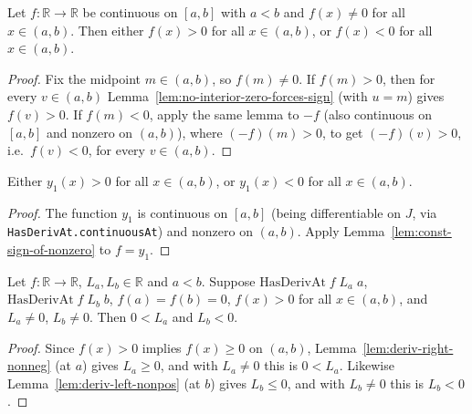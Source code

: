 \begin{lemma}
    \label{lem:const-sign-of-nonzero}
    \leanok
    Let $f : \mathbb{R} \to \mathbb{R}$ be continuous on $[a,b]$ with $a < b$ and
    $f(x) \ne 0$ for all $x \in (a,b)$. Then either $f(x) > 0$ for all
    $x \in (a,b)$, or $f(x) < 0$ for all $x \in (a,b)$.
\end{lemma}
\begin{proof}
    Fix the midpoint $m \in (a,b)$, so $f(m) \ne 0$. If $f(m) > 0$, then for
    every $v \in (a,b)$ Lemma~\ref{lem:no-interior-zero-forces-sign} (with
    $u = m$) gives $f(v) > 0$. If $f(m) < 0$, apply the same lemma to $-f$ (also
    continuous on $[a,b]$ and nonzero on $(a,b)$), where $(-f)(m) > 0$, to get
    $(-f)(v) > 0$, i.e.\ $f(v) < 0$, for every $v \in (a,b)$.
\end{proof}

\begin{lemma}
    \label{lem:y1-sign-constant}
    \leanok
    Either $y_1(x) > 0$ for all $x \in (a,b)$, or $y_1(x) < 0$ for all
    $x \in (a,b)$.
\end{lemma}
\begin{proof}
    The function $y_1$ is continuous on $[a,b]$ (being differentiable on $J$,
    via \texttt{HasDerivAt.continuousAt}) and nonzero on $(a,b)$. Apply
    Lemma~\ref{lem:const-sign-of-nonzero} to $f = y_1$.
\end{proof}

\begin{lemma}
    \label{lem:positive-deriv-endpoints}
    \leanok
    Let $f : \mathbb{R} \to \mathbb{R}$, $L_a, L_b \in \mathbb{R}$ and $a < b$.
    Suppose $\mathrm{HasDerivAt}\;f\;L_a\;a$, $\mathrm{HasDerivAt}\;f\;L_b\;b$,
    $f(a) = f(b) = 0$, $f(x) > 0$ for all $x \in (a,b)$, and $L_a \ne 0$,
    $L_b \ne 0$. Then $0 < L_a$ and $L_b < 0$.
\end{lemma}
\begin{proof}
    Since $f(x) > 0$ implies $f(x) \ge 0$ on $(a,b)$,
    Lemma~\ref{lem:deriv-right-nonneg} (at $a$) gives $L_a \ge 0$, and with
    $L_a \ne 0$ this is $0 < L_a$. Likewise Lemma~\ref{lem:deriv-left-nonpos}
    (at $b$) gives $L_b \le 0$, and with $L_b \ne 0$ this is $L_b < 0$.
\end{proof}

